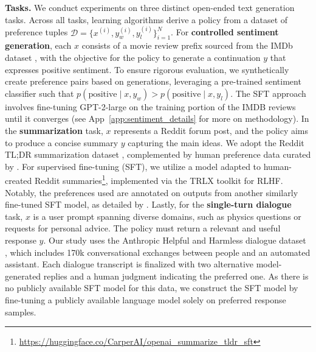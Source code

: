 \textbf{Tasks.} We conduct experiments on three distinct open-ended text generation tasks. Across all tasks, learning algorithms derive a policy from a dataset of preference tuples $\mathcal{D}=\bigl\{x^{(i)}, y_w^{(i)}, y_l^{(i)}\bigr\}_{i=1}^N$. For \textbf{controlled sentiment generation}, each $x$ consists of a movie review prefix sourced from the IMDb dataset \cite{maas-EtAl:2011:ACL-HLT2011}, with the objective for the policy to generate a continuation $y$ that expresses positive sentiment. To ensure rigorous evaluation, we synthetically create preference pairs based on generations, leveraging a pre-trained sentiment classifier such that $p(\text{positive}\mid x,y_w)>p(\text{positive}\mid x,y_l)$. The SFT approach involves fine-tuning GPT-2-large on the training portion of the IMDB reviews until it converges (see App~\ref{app:sentiment_details} for more on methodology). In the \textbf{summarization} task, $x$ represents a Reddit forum post, and the policy aims to produce a concise summary $y$ capturing the main ideas. We adopt the Reddit TL;DR summarization dataset \citep{volske-etal-2017-tl}, complemented by human preference data curated by \citeauthor{stiennon2022learning}. For supervised fine-tuning (SFT), we utilize a model adapted to human-created Reddit summaries\footnote{\url{https://huggingface.co/CarperAI/openai_summarize_tldr_sft}}, implemented via the TRLX \citep{leandro_von_werra_2023_7790115} toolkit for RLHF. Notably, the preferences used are annotated on outputs from another similarly fine-tuned SFT model, as detailed by \citeauthor{stiennon2022learning}. Lastly, for the \textbf{single-turn dialogue} task, $x$ is a user prompt spanning diverse domains, such as physics questions or requests for personal advice. The policy must return a relevant and useful response $y$. Our study uses the Anthropic Helpful and Harmless dialogue dataset \citep{bai2022training}, which includes 170k conversational exchanges between people and an automated assistant. Each dialogue transcript is finalized with two alternative model-generated replies and a human judgment indicating the preferred one. As there is no publicly available SFT model for this data, we construct the SFT model by fine-tuning a publicly available language model solely on preferred response samples.

